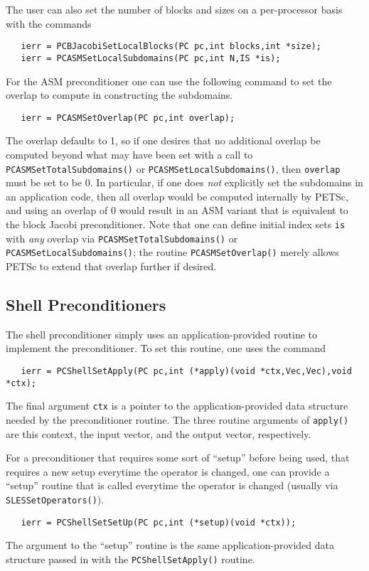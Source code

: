 The user can also set the number of blocks and sizes on a per-processor
basis with the commands
\begin{verbatim}
   ierr = PCBJacobiSetLocalBlocks(PC pc,int blocks,int *size);
   ierr = PCASMSetLocalSubdomains(PC pc,int N,IS *is);
\end{verbatim}

For the ASM preconditioner one can use the following command to set
the overlap to compute in constructing the subdomains.
\begin{verbatim}
   ierr = PCASMSetOverlap(PC pc,int overlap);
\end{verbatim}
The overlap defaults to 1, so if one desires that no additional
overlap be computed beyond what may have been set with a call to {\tt
PCASMSetTotalSubdomains()} or {\tt PCASMSetLocalSubdomains()}, then
{\tt overlap} must be set to be 0.  In particular, if one does {\em
not} explicitly set the subdomains in an application code, then all
overlap would be computed internally by PETSc, and using an overlap of
0 would result in an ASM variant that is equivalent to the block
Jacobi preconditioner.  Note that one can define initial index sets
{\tt is} with {\em any} overlap via {\tt PCASMSetTotalSubdomains()} or
{\tt PCASMSetLocalSubdomains()}; the routine {\tt PCASMSetOverlap()}
merely allows PETSc to extend that overlap further if desired.

\subsection{Shell Preconditioners}

The shell preconditioner simply uses an application-provided routine to 
implement the preconditioner. To set this routine, one uses the 
command 
\begin{verbatim}
   ierr = PCShellSetApply(PC pc,int (*apply)(void *ctx,Vec,Vec),void *ctx);
\end{verbatim}
The final argument {\tt ctx} is a pointer to the application-provided 
data structure needed by the preconditioner routine.
The three routine arguments of {\tt apply()} are this context, the
input vector, and the output vector, respectively.

For a preconditioner that requires some sort of ``setup'' before being used,
that requires a new setup everytime the operator is changed, one can 
provide a ``setup'' routine that is called everytime the operator is 
changed (usually via {\tt SLESSetOperators()}).
\begin{verbatim}
   ierr = PCShellSetSetUp(PC pc,int (*setup)(void *ctx));
\end{verbatim}
The argument to the ``setup'' routine is the same application-provided 
data structure passed in with the {\tt PCShellSetApply()} routine.

